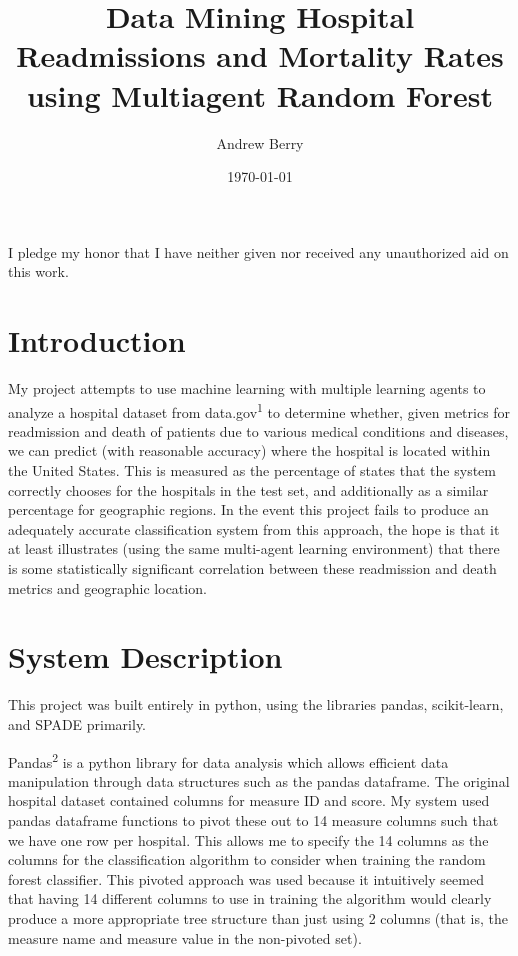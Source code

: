 \documentclass{article}
\title{Data Mining Hospital Readmissions and Mortality Rates using Multiagent Random Forest}
\author{Andrew Berry}
\date{\today}
\begin{document}
\maketitle

I pledge my honor that I have neither given nor received any unauthorized aid on this work.

\section{Introduction}
\par
My project attempts to use machine learning with multiple learning agents to analyze a hospital dataset from data.gov\textsuperscript{1} to determine whether, given metrics for readmission and death of patients due to various medical conditions and diseases, we can predict (with reasonable accuracy) where the hospital is located within the United States. This is measured as the percentage of states that the system correctly chooses for the hospitals in the test set, and additionally as a similar percentage for geographic regions. In the event this project fails to produce an adequately accurate classification system from this approach, the hope is that it at least illustrates (using the same multi-agent learning environment) that there is some statistically significant correlation between these readmission and death metrics and geographic location.

\section{System Description}
\par
This project was built entirely in python, using the libraries pandas, scikit-learn, and SPADE primarily. 

\par
Pandas\textsuperscript{2} is a python library for data analysis which allows efficient data manipulation through data structures such as the pandas dataframe. The original hospital dataset contained columns for measure ID and score. My system used pandas dataframe functions to pivot these out to 14 measure columns such that we have one row per hospital. This allows me to specify the 14 columns as the columns for the classification algorithm to consider when training the random forest classifier. This pivoted approach was used because it intuitively seemed that having 14 different columns to use in training the algorithm would clearly produce a more appropriate tree structure than just using 2 columns (that is, the measure name and measure value in the non-pivoted set). 
\end{document}
